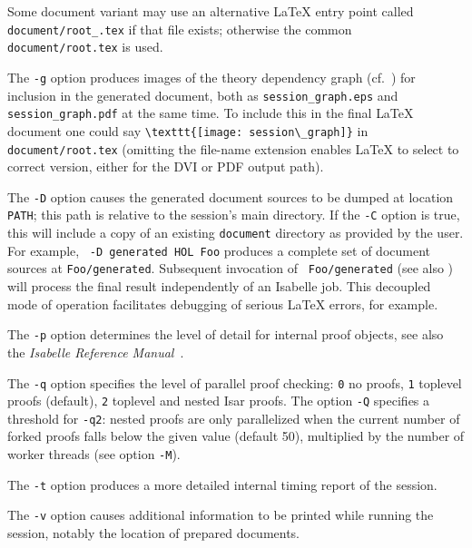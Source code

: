 \begin{isabellebody}
\begin{isamarkuptext}
  Some document variant  may use an alternative {\LaTeX}
  entry point called \verb|document/root_|\verb|.tex| if that file exists; otherwise the common
  \verb|document/root.tex| is used.

  \medskip The \verb|-g| option produces images of the theory
  dependency graph (cf.\ ) for inclusion in the
  generated document, both as \verb|session_graph.eps| and
  \verb|session_graph.pdf| at the same time.  To include this in
  the final {\LaTeX} document one could say \verb|\texttt{[image: session\_graph]}| in \verb|document/root.tex| (omitting the file-name extension enables
  {\LaTeX} to select to correct version, either for the DVI or PDF
  output path).

  \medskip The \verb|-D| option causes the generated document
  sources to be dumped at location \verb|PATH|; this path is
  relative to the session's main directory.  If the \verb|-C|
  option is true, this will include a copy of an existing \verb|document| directory as provided by the user.  For example, \hyperlink{tool.usedir}{\mbox{}}~\verb|-D generated HOL Foo| produces a complete set
  of document sources at \verb|Foo/generated|.  Subsequent
  invocation of \hyperlink{tool.document}{\mbox{}}~\verb|Foo/generated| (see also
  ) will process the final result
  independently of an Isabelle job.  This decoupled mode of operation
  facilitates debugging of serious {\LaTeX} errors, for example.

  \medskip The \verb|-p| option determines the level of detail
  for internal proof objects, see also the \emph{Isabelle Reference
  Manual}~\cite{isabelle-ref}.

  \medskip The \verb|-q| option specifies the level of parallel
  proof checking: \verb|0| no proofs, \verb|1| toplevel
  proofs (default), \verb|2| toplevel and nested Isar proofs.
  The option \verb|-Q| specifies a threshold for \verb|-q2|: nested proofs are only parallelized when the current number
  of forked proofs falls below the given value (default 50),
  multiplied by the number of worker threads (see option \verb|-M|).

  \medskip The \verb|-t| option produces a more detailed
  internal timing report of the session.

  \medskip The \verb|-v| option causes additional information
  to be printed while running the session, notably the location of
  prepared documents.


\end{isamarkuptext}
\end{isabellebody}
